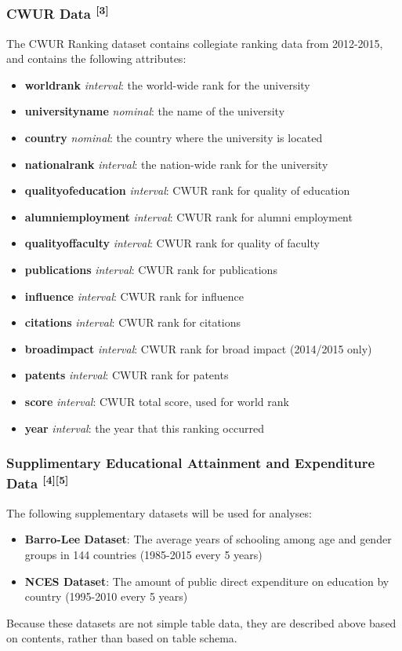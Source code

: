\documentclass[12pt]{article}
\begin{document}
\subsubsection{CWUR Data \textsuperscript{[3]}}
The CWUR Ranking dataset contains collegiate ranking data from 2012-2015, and contains the following attributes:
\begin{itemize}
\item \textbf{world\textunderscore rank} \textit{interval}: the world-wide rank for the university
\item \textbf{university\textunderscore name} \textit{nominal}: the name of the university
\item \textbf{country} \textit{nominal}: the country where the university is located
\item \textbf{national\textunderscore rank} \textit{interval}: the nation-wide rank for the university
\item \textbf{quality\textunderscore of\textunderscore education} \textit{interval}: CWUR rank for quality of education
\item \textbf{alumni\textunderscore employment} \textit{interval}: CWUR rank for alumni employment
\item \textbf{quality\textunderscore of\textunderscore faculty} \textit{interval}: CWUR rank for quality of faculty
\item \textbf{publications} \textit{interval}: CWUR rank for publications
\item \textbf{influence} \textit{interval}: CWUR rank for influence
\item \textbf{citations} \textit{interval}: CWUR rank for citations
\item \textbf{broad\textunderscore impact} \textit{interval}: CWUR rank for broad impact (2014/2015 only)
\item \textbf{patents} \textit{interval}: CWUR rank for patents
\item \textbf{score} \textit{interval}: CWUR total score, used for world rank
\item \textbf{year} \textit{interval}: the year that this ranking occurred
\end{itemize}

\subsubsection{Supplimentary Educational Attainment and Expenditure Data \textsuperscript{[4][5]}}
The following supplementary datasets will be used for analyses:
\begin{itemize}
\item \textbf{Barro-Lee Dataset}: The average years of schooling among age and gender groups in 144 countries (1985-2015 every 5 years)
\item \textbf{NCES Dataset}: The amount of public direct expenditure on education by country (1995-2010 every 5 years)
\end{itemize}
Because these datasets are not simple table data, they are described above based on contents, rather than based on table schema.
\end{document}
